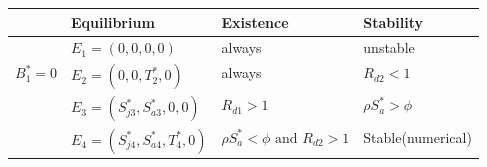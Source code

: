 \footnotesize{
\setlength{\arrayrulewidth}{.25mm}
\renewcommand{\arraystretch}{1.8}
\begin{tabular}{|m{1.2cm} |m{3cm}|m{3cm}|m{2.56cm}|} 
\hline
\rule{0pt}{.3cm} &Equilibrium & Existence & Stability \\
\hline
\rule{0pt}{.3cm} &$E_1= (0,0,0,0)$ & always & unstable\\

\rule{0pt}{.3cm} $B_1^*=0$ &$E_2= (0,0,T_2^*,0)$ & always & $R_{d2} < 1$ \\

\rule{0pt}{.3cm}&$E_3= (S_{j3}^*, S_{a3}^*, 0,0)$ & $R_{d1} > 1$ & ${\rho}{S_a^*} > \phi$\\


\rule{0pt}{.3cm}&$E_4= (S_{j4}^*, S_{a4}^*, T_4^*, 0)$ & ${\rho}{S_a^*} < \phi \text{ and }  R_{d2} > 1$& Stable(numerical)\\
\hline


\end{tabular}
}